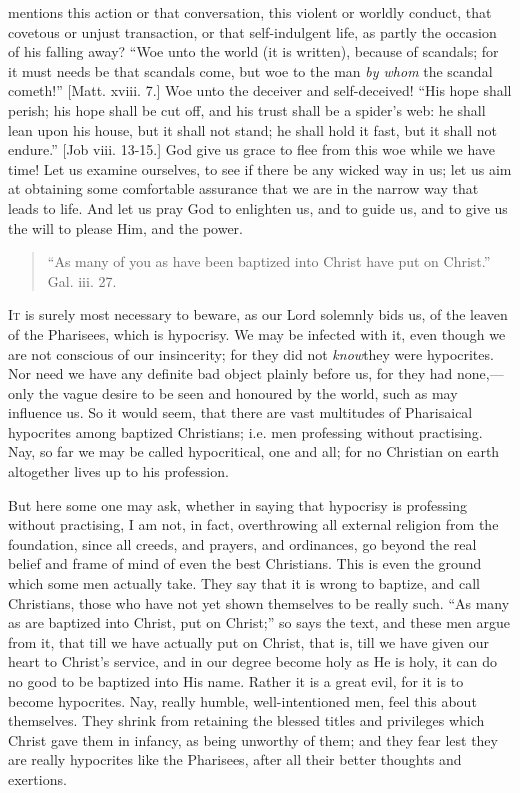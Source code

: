 mentions this action or that conversation, this violent
or worldly conduct, that covetous or unjust transaction,
or that self-indulgent life, as partly the occasion of
his falling away? ``Woe unto the world (it is
written), because of scandals; for it must needs be that
scandals come, but woe to the man \emph{by whom} the
scandal cometh!'' [Matt. xviii. 7.] Woe unto the
deceiver and self-deceived! ``His hope shall perish;
his hope shall be cut off, and his trust shall be a
spider's web: he shall lean upon his house, but it shall
not stand; he shall hold it fast, but it shall not
endure.'' [Job viii. 13-15.] God give us grace to
flee from this woe while we have time! Let us examine
ourselves, to see if there be any wicked way in us; let
us aim at obtaining some comfortable assurance that we
are in the narrow way that leads to life. And let us pray
God to enlighten us, and to guide us, and to give us the
will to please Him, and the power.


\begin{quote}

``As many of you as have been baptized into
Christ have put on Christ.'' Gal. iii. 27.

\end{quote}

I\textsc{t} is surely most necessary to beware, as our Lord
solemnly bids us, of the leaven of the Pharisees, which
is hypocrisy. We may be infected with it, even though we
are not conscious of our insincerity; for they did not \emph{know}they were hypocrites. Nor need we have any definite
bad object plainly before us, for they had
none,—only the vague desire to be seen and honoured
by the world, such as may influence us. So it would seem,
that there are vast multitudes of Pharisaical hypocrites
among baptized Christians; i.e. men professing without
practising. Nay, so far we may be called hypocritical,
one and all; for no Christian on earth altogether lives
up to his profession.

But here some one may ask, whether in saying that
hypocrisy is professing without practising, I am not, in
fact, overthrowing all external religion from the
foundation, since all creeds, and prayers, and
ordinances, go beyond the real belief and frame of mind
of even the best Christians. This is even the ground
which some men actually take. They say that it is wrong
to baptize, and call Christians, those who have not yet
shown themselves to be really such. ``As many as are
baptized into Christ, put on Christ;'' so says the
text, and these men argue from it, that till we have
actually put on Christ, that is, till we have given our
heart to Christ's service, and in our degree become holy
as He is holy, it can do no good to be baptized into His
name. Rather it is a great evil, for it is to become
hypocrites. Nay, really humble, well-intentioned men,
feel this about themselves. They shrink from retaining
the blessed titles and privileges which Christ gave them
in infancy, as being unworthy of them; and they fear lest
they are really hypocrites like the Pharisees, after all
their better thoughts and exertions.

